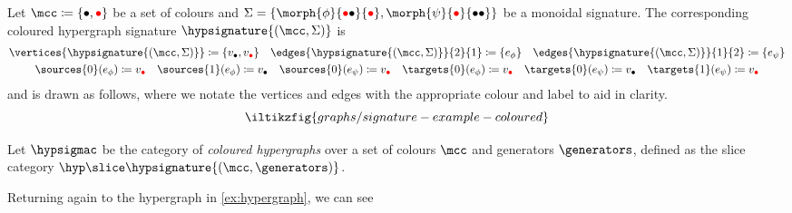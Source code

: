 \begin{example}\label{ex:labelled-hypergraph}
    Let \(\mcc \coloneqq \{\bullet,\redbullet\}\) be a set of colours and
    \(\Sigma = \{\morph{\phi}{\redbullet\bullet}{\redbullet}, \morph{\psi}{\redbullet}{\bullet\bullet}\}\) be a monoidal
    signature.
    The corresponding coloured hypergraph signature \(\hypsignature{(\mcc,\Sigma)}\) is
    \begin{gather*}
        \vertices{\hypsignature{(\mcc,\Sigma)}} \coloneqq \{v_{\bullet},v_{\redbullet}\}
        \quad
        \edges{\hypsignature{(\mcc,\Sigma)}}{2}{1} \coloneqq \{e_\phi\}
        \quad
        \edges{\hypsignature{(\mcc,\Sigma)}}{1}{2} \coloneqq \{e_\psi\}
        \\
        \sources{0}(e_\phi) \coloneqq v_{\redbullet}
        \quad
        \sources{1}(e_\phi) \coloneqq v_{\bullet}
        \quad
        \sources{0}(e_\psi) \coloneqq v_{\redbullet}
        \quad
        \targets{0}(e_\phi) \coloneqq v_{\redbullet}
        \quad
        \targets{0}(e_\psi) \coloneqq v_{\bullet}
        \quad
        \targets{1}(e_\psi) \coloneqq v_{\redbullet}
    \end{gather*}
    and is drawn as follows, where we notate the vertices and edges with the
    appropriate colour and label to aid in clarity.
    \[
        \iltikzfig{graphs/signature-example-coloured}
    \]
\end{example}

\begin{definition}
    Let \(\hypsigmac\) be the category of \emph{coloured hypergraphs} over a set
    of colours \(\mcc\) and generators \(\generators\), defined as the slice
    category \(\hyp \slice \hypsignature{(\mcc,\generators)}\).
\end{definition}

\begin{example}
    Returning again to the hypergraph in \cref{ex:hypergraph}, we can see
\end{example}